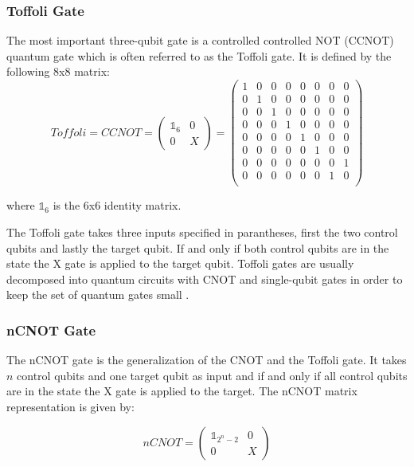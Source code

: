 \subsubsection{Toffoli Gate}
\label{subsubsubsec:toffoligate}

The most important three-qubit gate is a controlled controlled NOT (CCNOT) quantum gate which is often referred to as the Toffoli gate. It is defined by the following 8x8 matrix:
\begin{equation}
Toffoli = CCNOT = \begin{pmatrix}
 \mathbb{1}_6 & 0 \\ 
 0 & X
 \end{pmatrix} = \begin{pmatrix}
 1 & 0 & 0 & 0 & 0 & 0 & 0 & 0 \\ 
 0 & 1 & 0 & 0 & 0 & 0 & 0 & 0 \\ 
 0 & 0 & 1 & 0 & 0 & 0 & 0 & 0 \\ 
 0 & 0 & 0 & 1 & 0 & 0 & 0 & 0 \\ 
 0 & 0 & 0 & 0 & 1 & 0 & 0 & 0 \\ 
 0 & 0 & 0 & 0 & 0 & 1 & 0 & 0 \\
 0 & 0 & 0 & 0 & 0 & 0 & 0 & 1 \\ 
 0 & 0 & 0 & 0 & 0 & 0 & 1 & 0 \\ 
 \end{pmatrix}
\end{equation}

where $\mathbb{1}_6$ is the 6x6 identity matrix.

The Toffoli gate takes three inputs specified in parantheses, first the two control qubits and lastly the target qubit. If and only if both control qubits are in the \1 state the X gate is applied to the target qubit. Toffoli gates are usually decomposed into quantum circuits with CNOT and single-qubit gates in order to keep the set of quantum gates small \cite{shende2008cnot}.

\subsubsection{nCNOT Gate}
\label{subsubsubsec:ncnotgate}

The nCNOT gate is the generalization of the CNOT and the Toffoli gate. It takes $n$ control qubits and one target qubit as input and if and only if all control qubits are in the \1 state the X gate is applied to the target. The nCNOT matrix representation is given by:
 
\begin{equation}
nCNOT = \begin{pmatrix}
 \mathbb{1}_{2^n-2} & 0 \\ 
 0 & X
 \end{pmatrix}
\end{equation}


